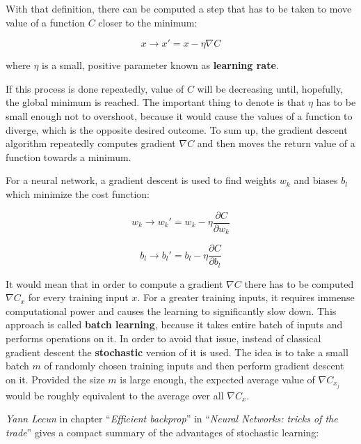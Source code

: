 With that definition, there can be computed a step that has to be taken to move value of a function $C$ closer to the minimum:

\begin{equation}
x \longrightarrow x' = x - \eta \nabla C
\end{equation}

where $\eta$ is a small, positive parameter known as \textbf{learning rate}.

If this process is done repeatedly, value of $C$ will be decreasing until, hopefully, the global minimum is reached. The important thing to denote is that $\eta$ has to be small enough not to overshoot, because it would cause the values of a function to diverge, which is the opposite desired outcome. To sum up, the gradient descent algorithm repeatedly computes gradient $\nabla C$ and then moves the return value of a function towards a minimum.

\newpage

For a neural network, a gradient descent is used to find weights $w_k$ and biases $b_l$ which minimize the cost function:

\begin{equation}
    w_k \longrightarrow w_k' = w_k - \eta \frac{\partial C}{\partial w_k}
\end{equation}

\begin{equation}
    b_l \longrightarrow b_l' = b_l - \eta \frac{\partial C}{\partial b_l}
\end{equation}

It would mean that in order to compute a gradient $\nabla C$ there has to be computed $\nabla C_x$ for every training input $x$. For a greater training inputs, it requires immense computational power and causes the learning to significantly slow down. This approach is called \textbf{batch learning}, because it takes entire batch of inputs and performs operations on it. In order to avoid that issue, instead of classical gradient descent the \textbf{stochastic} version of it is used. The idea is to take a small batch $m$ of randomly chosen training inputs and then perform gradient descent on it. Provided the size $m$ is large enough, the expected average value of $\nabla C_{x_j}$ would be roughly equivalent to the average over all $\nabla C_x$.

\emph{Yann Lecun} in chapter ``\emph{Efficient backprop}'' in ``\emph{Neural Networks: tricks of the trade}'' \cite{EfficientBackProp} gives a compact summary of the advantages of stochastic learning:

